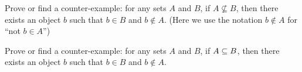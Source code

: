 \begin{xca}
Prove or find a counter-example: for any sets $A$ and $B$, if
$A\nsubseteq B$, then there exists an object $b$ such that $b\in B$ and 
$b\notin A$. (Here we use the notation $b\notin A$ for ``not $b\in A$'')
\end{xca}

\begin{xca}
Prove or find a counter-example: for any sets $A$ and $B$, if
$A\propersubset B$, then there exists an object $b$ such that $b\in B$
and $b\notin A$. 
\end{xca}
